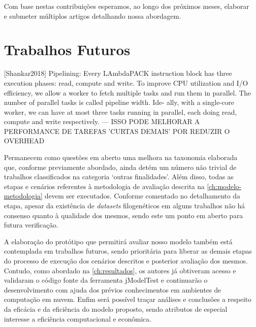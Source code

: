 \documentclass[english,brazilian]{UNISINOSmonografia} %
\begin{document}
Com base nestas contribuições esperamos, ao longo dos próximos meses, elaborar e submeter múltiplos artigos detalhando nossa abordagem.



\section{Trabalhos Futuros}


[Shankar2018]
Pipelining: Every LAmbdaPACK instruction block has three execution phases: read, compute and write. To improve CPU utilization and I/O efficiency, we allow a worker to fetch multiple tasks and run them in parallel. The number of parallel tasks is called pipeline width. Ide- ally, with a single-core worker, we can have at most three tasks running in parallel, each doing read, compute and write respectively.
	--- ISSO PODE MELHORAR A PERFORMANCE DE TAREFAS 'CURTAS DEMAIS' POR REDUZIR O OVERHEAD





Permanecem como questões em aberto uma melhora na taxonomia elaborada que, conforme previamente abordado, ainda detém um número não trivial de trabalhos classificados na categoria \textquoteleft outras finalidades\textquoteright.
Além disso, todas as etapas e cenários referentes à metodologia de avaliação descrita na \autoref{ch:modelo-metodologia} devem ser executados.
Conforme comentado no detalhamento da etapa, apesar da existência de \textit{datasets} filogenéticos em alguns trabalhos não há consenso quanto à qualidade dos mesmos, sendo este um ponto em aberto para futura verificação.


A elaboração do protótipo que permitirá avaliar nosso modelo também está contemplada em trabalhos futuros, sendo prioritária para liberar as demais etapas do processo de execução dos cenários descritos e posterior avaliação dos mesmos.
Contudo, como abordado na \autoref{ch:resultados}, os autores já obtiveram acesso e validaram o código fonte da ferramenta jModelTest e continuarão o desenvolvimento com ajuda dos prévios conhecimentos em ambientes de computação em nuvem.
Enfim será possível traçar análises e conclusões a respeito da eficácia e da eficiência do modelo proposto, sendo atributos de especial interesse a eficiência computacional e econômica.
\end{document}
